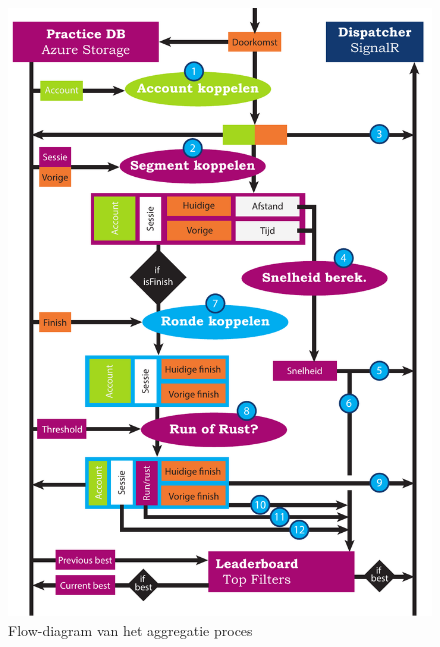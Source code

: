 \documentclass[dutch]{style/tudelft-report}
\begin{document}
\begin{figure}[ht]
  \begin{center}
    \includegraphics[width=\textwidth]{style/images/Aggregatie-flow}
  \end{center}
  \caption{Flow-diagram van het aggregatie proces}
  \label{fig:aggregatie-flow-large}
\end{figure}


\end{document}
